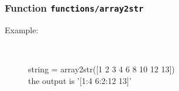 \subsubsection[Function \texttt{array2str}]{Function \texttt{functions/array2str}}%
%
\label{ref_functions__array2str}%
\hypertarget{ref_functions__array2str}{}%
\begin{description}
%
%
%
%
%
\item[Example:]~
\begin{lyxcode}  string = array2str([1 2 3 4 6 8 10 12 13])
\\%
 the output is '[1:4 6:2:12 13]'
\\%
\end{lyxcode}
%
%
%
\end{description}
\methodline%
